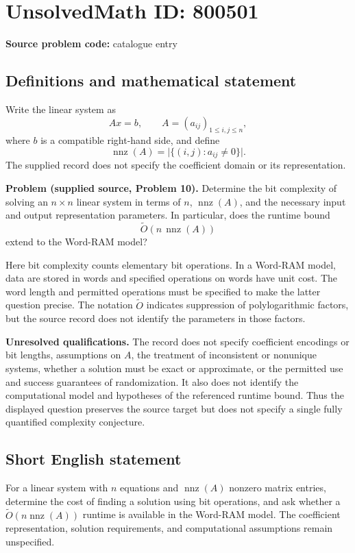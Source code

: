 \documentclass[11pt]{article}
\begin{document}
\section*{UnsolvedMath ID: 800501}
\textbf{Source problem code:} catalogue entry
\subsection{Definitions and mathematical statement}
Write the linear system as
\[
Ax=b,\qquad A=(a_{ij})_{1\leq i,j\leq n},
\]
where \(b\) is a compatible right-hand side, and define
\[
\operatorname{nnz}(A)=\bigl|\{(i,j):a_{ij}\neq 0\}\bigr|.
\]
The supplied record does not specify the coefficient domain or its representation.

\textbf{Problem (supplied source, Problem 10).} Determine the bit complexity of solving an \(n\times n\) linear system in terms of \(n\), \(\operatorname{nnz}(A)\), and the necessary input and output representation parameters. In particular, does the runtime bound
\[
\widetilde O\!\left(n\,\operatorname{nnz}(A)\right)
\]
extend to the Word-RAM model?

Here bit complexity counts elementary bit operations. In a Word-RAM model, data are stored in words and specified operations on words have unit cost. The word length and permitted operations must be specified to make the latter question precise. The notation \(\widetilde O\) indicates suppression of polylogarithmic factors, but the source record does not identify the parameters in those factors.

\textbf{Unresolved qualifications.} The record does not specify coefficient encodings or bit lengths, assumptions on \(A\), the treatment of inconsistent or nonunique systems, whether a solution must be exact or approximate, or the permitted use and success guarantees of randomization. It also does not identify the computational model and hypotheses of the referenced runtime bound. Thus the displayed question preserves the source target but does not specify a single fully quantified complexity conjecture.
\subsection{Short English statement}
For a linear system with \(n\) equations and \(\operatorname{nnz}(A)\) nonzero matrix entries, determine the cost of finding a solution using bit operations, and ask whether a \(\widetilde O(n\operatorname{nnz}(A))\) runtime is available in the Word-RAM model. The coefficient representation, solution requirements, and computational assumptions remain unspecified.
\end{document}
